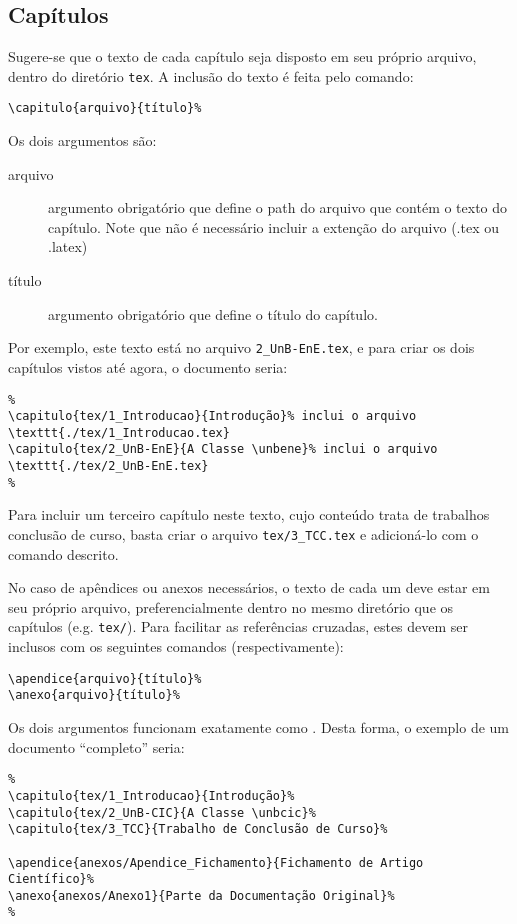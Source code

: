 \subsection{Capítulos}
Sugere-se que o texto de cada capítulo seja disposto em seu próprio arquivo, dentro do diretório 
\texttt{tex}. A inclusão do texto é feita pelo comando:
\begin{verbatim}
\capitulo{arquivo}{título}%
\end{verbatim}

Os dois argumentos são:
\begin{description}%
	\item[arquivo] argumento obrigatório que define o path do arquivo que contém o texto do 
	capítulo. 
	Note que não é necessário incluir a extenção do arquivo (.tex ou .latex)
	\item[título] argumento obrigatório que define o título do capítulo.
\end{description}%

Por exemplo, este texto está no arquivo \texttt{2\_UnB-EnE.tex}, e para criar os dois capítulos
vistos até agora, o documento seria:

\begin{verbatim}
%
\capitulo{tex/1_Introducao}{Introdução}% inclui o arquivo \texttt{./tex/1_Introducao.tex}
\capitulo{tex/2_UnB-EnE}{A Classe \unbene}% inclui o arquivo \texttt{./tex/2_UnB-EnE.tex}
%
\end{verbatim}

Para incluir um terceiro capítulo neste texto, cujo conteúdo trata de trabalhos conclusão de curso,
basta criar o arquivo \texttt{tex/3\_TCC.tex} e adicioná-lo com o comando descrito.

No caso de apêndices ou anexos necessários, o texto de cada um deve estar em seu próprio arquivo, 
preferencialmente dentro no mesmo diretório que os capítulos (e.g. \texttt{tex/}). Para facilitar
as referências cruzadas, estes devem ser inclusos com os seguintes comandos
(respectivamente):
\begin{verbatim}
\apendice{arquivo}{título}%
\anexo{arquivo}{título}%
\end{verbatim}

Os dois argumentos funcionam exatamente como . Desta forma, o exemplo de um
documento ``completo'' seria: %

\begin{verbatim}
%
\capitulo{tex/1_Introducao}{Introdução}%
\capitulo{tex/2_UnB-CIC}{A Classe \unbcic}%
\capitulo{tex/3_TCC}{Trabalho de Conclusão de Curso}%

\apendice{anexos/Apendice_Fichamento}{Fichamento de Artigo Científico}%
\anexo{anexos/Anexo1}{Parte da Documentação Original}%
%
\end{verbatim}

